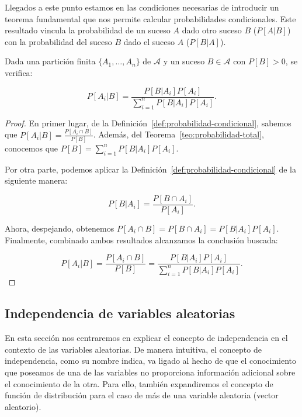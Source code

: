 Llegados a este punto estamos en las condiciones necesarias de introducir un teorema fundamental que nos permite calcular probabilidades condicionales. Este resultado vincula la probabilidad de un suceso $A$ dado otro suceso $B$ ($P[A|B]$) con la probabilidad del suceso $B$ dado el suceso $A$ ($P[B|A]$).

\begin{teorema}\label{teo:teorema-de-bayes}
    Dada una partición finita $\{A_1, \ldots, A_n \}$ de $\mathcal{A}$ y un suceso $B \in \mathcal{A}$ con $P[B] > 0$, se verifica:

    \[ P[A_i | B] = \frac{P[B | A_i]P[A_i]}{\sum_{i=1}^n P[B|A_i]P[A_i]}. \]
\end{teorema}

\begin{proof}
    En primer lugar, de la Definición~\ref{def:probabilidad-condicional}, sabemos que
     $P[A_i|B] = \frac{P[A_i \cap B]}{P[B]}$. Además, del Teorema~\ref{teo:probabilidad-total}, conocemos que $P[B] = \sum_{i=1}^n P[B|A_i]P[A_i]$.

    Por otra parte, podemos aplicar la Definición~\ref{def:probabilidad-condicional} de la siguiente manera:

    \[ P[B|A_i] = \frac{P[B \cap A_i]}{P[A_i]}. \]

    Ahora, despejando, obtenemos $P[A_i \cap B] = P[B \cap A_i] = P[B|A_i]{P[A_i]}$. Finalmente, combinado ambos resultados alcanzamos la conclusión buscada:

    \[ P[A_i|B] = \frac{P[A_i \cap B]}{P[B]} = \frac{P[B | A_i]P[A_i]}{\sum_{i=1}^n P[B|A_i]P[A_i]}. \]
    
\end{proof}

\subsection{Independencia de variables aleatorias}

En esta sección nos centraremos en explicar el concepto de independencia en el contexto de las variables aleatorias. De manera intuitiva, el concepto de independencia, como su nombre indica, va ligado al hecho de que el conocimiento que poseamos de una de las variables no proporciona información adicional sobre el conocimiento de la otra. Para ello, también expandiremos el concepto de función de distribución para el caso de más de una variable aleatoria (vector aleatorio).

